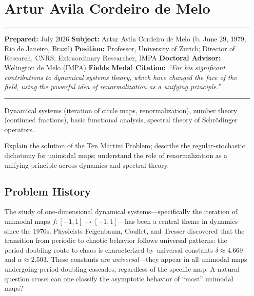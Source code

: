 \chapter{Artur Avila Cordeiro de Melo}\label{ch2014arturavila:artur-avila-cordeiro-de-melo-fields-medal-2014}

\begin{center}\rule{0.5\linewidth}{0.5pt}\end{center}

\textbf{Prepared:} July 2026 \textbf{Subject:} Artur Avila Cordeiro de Melo (b. June 29, 1979, Rio de Janeiro, Brazil) \textbf{Position:} Professor, University of Zurich; Director of Research, CNRS; Extraordinary Researcher, IMPA \textbf{Doctoral Advisor:} Welington de Melo (IMPA) \textbf{Fields Medal Citation:} \emph{``For his significant contributions to dynamical systems theory, which have changed the face of the field, using the powerful idea of renormalization as a unifying principle.''}

\begin{center}\rule{0.5\linewidth}{0.5pt}\end{center}

\begin{prereqs} Dynamical systems (iteration of circle maps, renormalization), number theory (continued fractions), basic functional analysis, spectral theory of Schr\"{o}dinger operators. \end{prereqs}

\begin{objectives} Explain the solution of the Ten Martini Problem; describe the regular-stochastic dichotomy for unimodal maps; understand the role of renormalization as a unifying principle across dynamics and spectral theory. \end{objectives}

\section{Problem History}

The study of one-dimensional dynamical systems---specifically the iteration of unimodal maps $f:[-1,1]\to[-1,1]$---has been a central theme in dynamics since the 1970s. Physicists Feigenbaum, Coullet, and Tresser discovered that the transition from periodic to chaotic behavior follows universal patterns: the period-doubling route to chaos is characterized by universal constants $\delta\approx 4.669$ and $\alpha\approx 2.503$. These constants are \emph{universal}---they appear in all unimodal maps undergoing period-doubling cascades, regardless of the specific map. A natural question arose: can one classify the asymptotic behavior of ``most'' unimodal maps?

